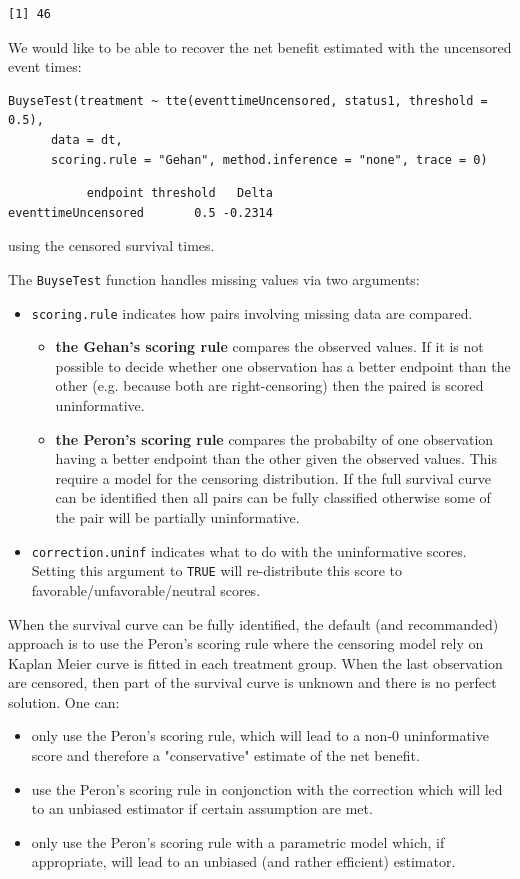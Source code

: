 \documentclass[12pt]{article}
\begin{document}
\begin{verbatim}
[1] 46
\end{verbatim}


We would like to be able to recover the net benefit estimated with the uncensored event times:
\lstset{language=r,label= ,caption= ,captionpos=b,numbers=none}
\begin{lstlisting}
BuyseTest(treatment ~ tte(eventtimeUncensored, status1, threshold = 0.5),
	  data = dt,
	  scoring.rule = "Gehan", method.inference = "none", trace = 0)
\end{lstlisting}

\begin{verbatim}
           endpoint threshold   Delta
eventtimeUncensored       0.5 -0.2314
\end{verbatim}


using the censored survival times.

\clearpage

The \texttt{BuyseTest} function handles missing values via two arguments:
\begin{itemize}
\item \texttt{scoring.rule} indicates how pairs involving missing data are compared. 
\begin{itemize}
\item \textbf{the Gehan's scoring rule} compares the observed values. If it is
not possible to decide whether one observation has a better
endpoint than the other (e.g. because both are right-censoring)
then the paired is scored uninformative.
\item \textbf{the Peron's scoring rule} compares the probabilty of one
observation having a better endpoint than the other given the
observed values. This require a model for the censoring
distribution. If the full survival curve can be identified then
all pairs can be fully classified otherwise some of the pair
will be partially uninformative.
\end{itemize}
\item \texttt{correction.uninf} indicates what to do with the uninformative
scores. Setting this argument to \texttt{TRUE} will re-distribute this
score to favorable/unfavorable/neutral scores.
\end{itemize}

When the survival curve can be fully identified, the default (and
recommanded) approach is to use the Peron's scoring rule where the
censoring model rely on Kaplan Meier curve is fitted in each treatment
group. When the last observation are censored, then part of the
survival curve is unknown and there is no perfect solution. One can:
\begin{itemize}
\item only use the Peron's scoring rule, which will lead to a non-0
uninformative score and therefore a "conservative" estimate of the net benefit.
\item use the Peron's scoring rule in conjonction with the correction
which will led to an unbiased estimator if certain assumption are met.
\item only use the Peron's scoring rule with a parametric model which, if
appropriate, will lead to an unbiased (and rather efficient)
estimator.
\end{itemize}
\end{document}
